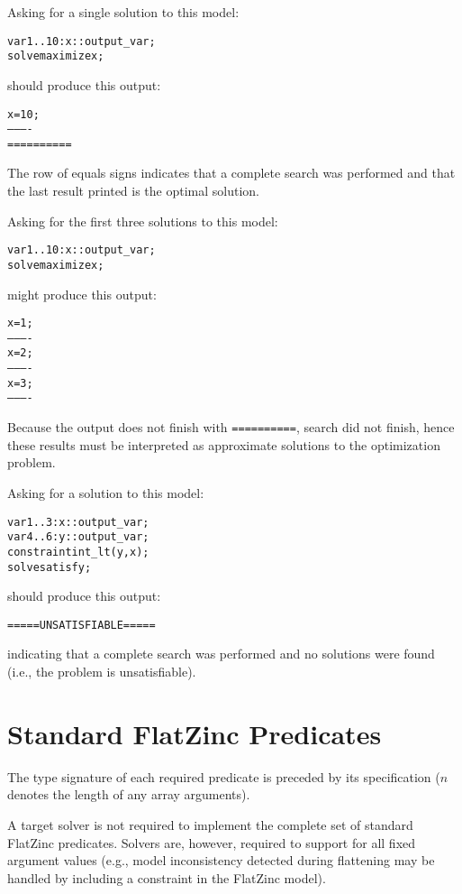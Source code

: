 \documentclass[a4paper]{article}
\begin{document}
Asking for a single solution to this model:
\begin{alltt}
var 1..10: x :: output_var;
solve maximize x;
\end{alltt}
should produce this output:
\begin{alltt}
x = 10;
----------
==========
\end{alltt}
The row of equals signs indicates that a complete search was performed
and that the last result printed is the optimal solution.

Asking for the first three solutions to this model:
\begin{alltt}
var 1..10: x :: output_var;
solve maximize x;
\end{alltt}
might produce this output:
\begin{alltt}
x = 1;
----------
x = 2;
----------
x = 3;
----------
\end{alltt}
Because the output does not finish with \texttt{==========}, search did not
finish, hence these results must be interpreted as approximate solutions
to the optimization problem.

Asking for a solution to this model:
\begin{alltt}
var 1..3: x :: output_var;
var 4..6: y :: output_var;
constraint int_lt(y, x);    % y < x.
solve satisfy;
\end{alltt}
should produce this output:
\begin{alltt}
=====UNSATISFIABLE=====
\end{alltt}
indicating that a complete search was performed and no solutions were
found (i.e., the problem is unsatisfiable).

\newpage

\appendix

\section{Standard FlatZinc Predicates}

The type signature of each required predicate is preceded by its
specification
($n$ denotes the length of any array arguments).

A target solver is not required to implement the complete set of
standard FlatZinc predicates.
Solvers are, however, required to support  for all fixed
argument values (e.g., model inconsistency detected during flattening
may be handled by including a constraint 
in the FlatZinc model).
\end{document}
